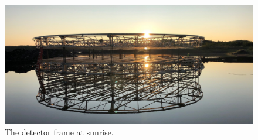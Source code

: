 \begin{figure} %
    \includegraphics[width=\textwidth]{diagrams/4-chips/sunrise.pdf}
    \caption*{The \chipsfive detector frame at sunrise.}
\end{figure}